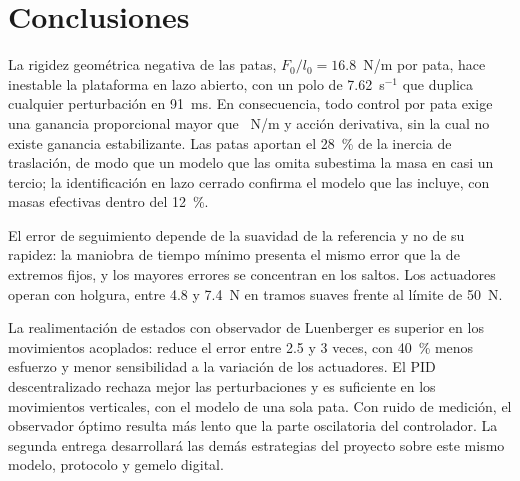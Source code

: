 \documentclass[conference]{IEEEtran}
\begin{document}
\section{Conclusiones}

La rigidez geométrica negativa de las patas, $F_0/l_0 = 16.8$~N/m por pata, hace inestable la plataforma en lazo abierto, con un polo de 7.62~s$^{-1}$ que duplica cualquier perturbación en 91~ms. En consecuencia, todo control por pata exige una ganancia proporcional mayor que \KlMax~N/m y acción derivativa, sin la cual no existe ganancia estabilizante. Las patas aportan el 28~\% de la inercia de traslación, de modo que un modelo que las omita subestima la masa en casi un tercio; la identificación en lazo cerrado confirma el modelo que las incluye, con masas efectivas dentro del 12~\%.

El error de seguimiento depende de la suavidad de la referencia y no de su rapidez: la maniobra de tiempo mínimo presenta el mismo error que la de extremos fijos, y los mayores errores se concentran en los saltos. Los actuadores operan con holgura, entre 4.8 y 7.4~N en tramos suaves frente al límite de 50~N.

La realimentación de estados con observador de Luenberger es superior en los movimientos acoplados: reduce el error entre 2.5 y 3 veces, con 40~\% menos esfuerzo y menor sensibilidad a la variación de los actuadores. El PID descentralizado rechaza mejor las perturbaciones y es suficiente en los movimientos verticales, con el modelo de una sola pata. Con ruido de medición, el observador óptimo resulta más lento que la parte oscilatoria del controlador. La segunda entrega desarrollará las demás estrategias del proyecto sobre este mismo modelo, protocolo y gemelo digital.
\end{document}
